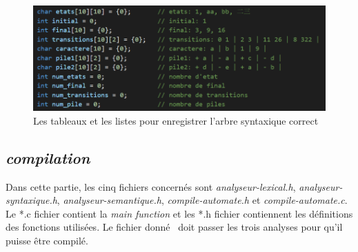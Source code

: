 \documentclass[a4paper,14pt,UTF8]{article}
\begin{document}
\begin{itemize}
\begin{figure}[H]
			\begin{center}
				\includegraphics[width=14cm]{analyse_semantique}
			\end{center}
			\caption{Les tableaux et les listes pour enregistrer l'arbre syntaxique correct}
		\end{figure}
		
	\end{itemize}

	\subsection{\textit{compilation}}
	
	\quad Dans cette partie, les cinq fichiers concernés sont \textit{analyseur-lexical.h}, \textit{analyseur-syntaxique.h}, \textit{analyseur-semantique.h}, \textit{compile-automate.h} et \textit{compile-automate.c}. Le *.c fichier contient la \textit{main function} et les *.h fichier contiennent les définitions des fonctions utilisées. Le fichier donné \ doit passer les trois analyses pour qu'il puisse être compilé.
	
\end{document}
